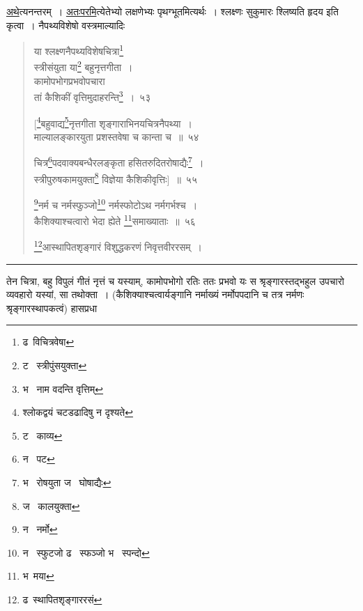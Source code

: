 \documentclass[11pt, openany]{book}
\begin{document}
\underline{अथे}त्यनन्तरम्~। \underline{अतःपरमि}त्येतेभ्यो लक्षणेभ्यः पृथग्भूतमित्यर्थः~। श्लक्ष्णः सुकुमारः श्लिष्यति हृदय इति कृत्वा~। नैपथ्यविशेषो वस्त्रमाल्यादिः

\newpage

\begin{quote}
{\na या श्लक्ष्णनैपथ्यविशेषचित्रा\renewcommand{\thefootnote}{1}\footnote{ढ\textendash\ विचित्रवेषा}\\
स्त्रीसंयुता या\renewcommand{\thefootnote}{2}\footnote{ट \textendash\ स्त्रीपुंसयुक्ता} बहुनृत्तगीता~।\\
कामोपभोगप्रभवोपचारा\\
तां कैशिकीं वृत्तिमुदाहरन्ति\renewcommand{\thefootnote}{3}\footnote{भ \textendash\ नाम वदन्ति वृत्तिम्}~।~५३

[\renewcommand{\thefootnote}{4}\footnote{श्लोकद्वयं चटडढादिषु न दृश्यते}बहुवाद्य\renewcommand{\thefootnote}{5}\footnote{ट \textendash\ काव्य}नृत्तगीता शृङ्गाराभिनयचित्रनैपथ्या~।\\
माल्यालङ्कारयुता प्रशस्तवेषा च कान्ता च~॥~५४

चित्र\renewcommand{\thefootnote}{6}\footnote{न \textendash\ पट}पदवाक्यबन्धैरलङ्कृता हसितरुदितरोषाद्यैः\renewcommand{\thefootnote}{7}\footnote{भ \textendash\ रोषयुता ज \textendash\ घोषाद्यैः}~।\\
स्त्रीपुरुषकामयुक्ता\renewcommand{\thefootnote}{8}\footnote{ज \textendash\ कालयुक्ता} विज्ञेया कैशिकीवृत्तिः]~॥~५५

\renewcommand{\thefootnote}{9}\footnote{न \textendash\ नर्मो}नर्म च नर्मस्फुञ्जो\renewcommand{\thefootnote}{10}\footnote{न \textendash\ स्फुटजो ढ \textendash\ स्फञ्जो भ \textendash\ स्पन्दो} नर्मस्फोटोऽथ नर्मगर्भश्च~।\\
कैशिक्याश्चत्वारो भेदा ह्येते \renewcommand{\thefootnote}{11}\footnote{भ\textendash\ मया}समाख्याताः~॥~५६

\renewcommand{\thefootnote}{12}\footnote{ढ\textendash\ स्थापितशृङ्गाररसं}आस्थापितशृङ्गारं विशुद्धकरणं निवृत्तवीररसम्~।}
\end{quote}

\hrule

\vspace{2mm}
\noindent
तेन चित्रा, बहु विपुलं गीतं नृत्तं च यस्याम्, कामोपभोगो रतिः ततः प्रभवो यः स श्रृङ्गारस्तद्भहुल उपचारो व्यवहारो यस्यां, सा तथोक्ता~। (कैशिक्याश्चत्वार्यङ्गानि नर्माख्यं नर्मोपपदानि च तत्र नर्मणः श्रृङ्गारस्थापकत्वं) हासप्रधा\textendash

\newpage
\end{document}
